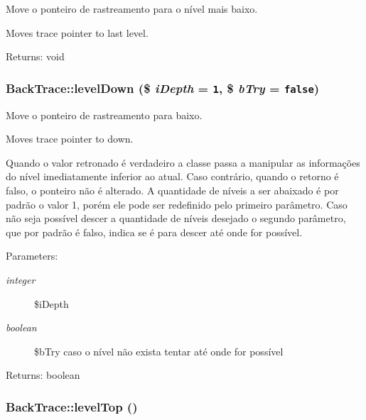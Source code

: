 Move o ponteiro de rastreamento para o nível mais baixo.

Moves trace pointer to last level.

\begin{Desc}
\item[Returns:]void \end{Desc}
\hypertarget{class_back_trace_1ad89e49be7244f6b543c131a87dd2b7}{
\subsubsection[{levelDown}]{\setlength{\rightskip}{0pt plus 5cm}BackTrace::levelDown (\$ {\em iDepth} = {\tt 1}, \/  \$ {\em bTry} = {\tt false})}}
\label{class_back_trace_1ad89e49be7244f6b543c131a87dd2b7}


Move o ponteiro de rastreamento para baixo.

Moves trace pointer to down.

Quando o valor retronado é verdadeiro a classe passa a manipular as informações do nível imediatamente inferior ao atual. Caso contrário, quando o retorno é falso, o ponteiro não é alterado. A quantidade de níveis a ser abaixado é por padrão o valor 1, porém ele pode ser redefinido pelo primeiro parâmetro. Caso não seja possível descer a quantidade de níveis desejado o segundo parâmetro, que por padrão é falso, indica se é para descer até onde for possível.

\begin{Desc}
\item[Parameters:]
\begin{description}
\item[{\em integer}]\$iDepth \item[{\em boolean}]\$bTry caso o nível não exista tentar até onde for possível \end{description}
\end{Desc}
\begin{Desc}
\item[Returns:]boolean \end{Desc}
\hypertarget{class_back_trace_a81a0634c18930a823eef59269d2d992}{
\subsubsection[{levelTop}]{\setlength{\rightskip}{0pt plus 5cm}BackTrace::levelTop ()}}
\label{class_back_trace_a81a0634c18930a823eef59269d2d992}


